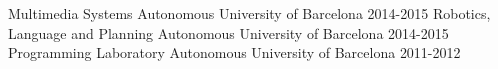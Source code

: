 


\begin{cvteaching}
  \cvclass
    {Multimedia Systems} %
    {} %
    {Autonomous University of Barcelona} %
    {2014-2015} %
  \cvclass
    {Robotics, Language and Planning} %
    {} %
    {Autonomous University of Barcelona} %
    {2014-2015} %
  \cvclass
    {Programming Laboratory} %
    {} %
    {Autonomous University of Barcelona} %
    {2011-2012} %
\end{cvteaching}

